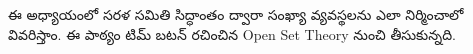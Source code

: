 \documentclass[../../../include/open-logic-section]{subfiles}
\begin{document}

\begin{editorial}
ఈ అధ్యాయంలో సరళ సమితి సిద్ధాంతం ద్వారా సంఖ్యా వ్యవస్థలను ఎలా
నిర్మించాలో వివరిస్తాం. ఈ పాఠ్యం టిమ్ బటన్ రచించిన Open Set
Theory నుంచి తీసుకున్నది.
\end{editorial}


\OLEndChapterHook
\end{document}
